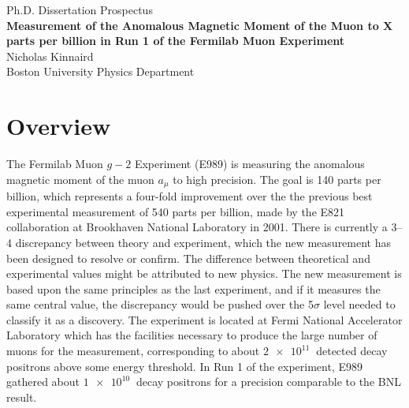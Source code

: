 \documentclass[12pt,letterpaper]{article}
\def\gmtwo{$g-2$\xspace}
\def\amu{$a_{\mu}$\xspace}
\begin{document}
\begin{center}
\Large{Ph.D. Dissertation Prospectus} \\\vspace{5mm}
\textbf{\Large{Measurement of the Anomalous Magnetic Moment of the Muon to X parts per billion in Run 1 of the Fermilab Muon  Experiment}} \\\vspace{5mm}
\large{Nicholas Kinnaird} \\\vspace{5mm}
\large{Boston University Physics Department} \\\vspace{5mm}
\end{center}


\section*{Overview}


The Fermilab Muon \gmtwo Experiment (E989) is measuring the anomalous magnetic moment of the muon \amu to high precision. The goal is 140 parts per billion, which represents a four-fold improvement over the the previous best experimental measurement of 540 parts per billion, made by the E821 collaboration at Brookhaven National Laboratory in 2001. There is currently a \SIrange{3}{4}{\sigma} discrepancy between theory and experiment, which the new measurement has been designed to resolve or confirm. The difference between theoretical and experimental values might be attributed to new physics. The new measurement is based upon the same principles as the last experiment, and if it measures the same central value, the discrepancy would be pushed over the 5$\sigma$ level needed to classify it as a discovery. The experiment is located at Fermi National Accelerator Laboratory which has the facilities necessary to produce the large number of muons for the measurement, corresponding to about $\SI{2e11}{}$ detected decay positrons above some energy threshold. In Run 1 of the experiment, E989 gathered about $\SI{1e10}{}$ decay positrons for a precision comparable to the BNL result.


\end{document}
